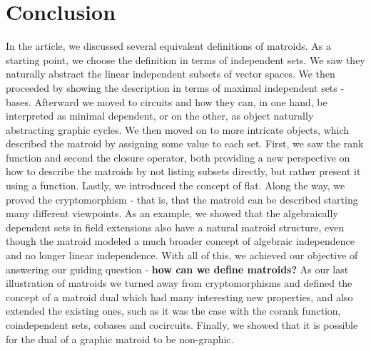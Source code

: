 \newpage
\section{Conclusion}
In the article, we discussed several equivalent definitions of matroids. As a starting point, we choose the definition in terms of independent sets. We saw they naturally abstract the linear independent subsets of vector spaces. We then proceeded by showing the description in terms of maximal independent sets - bases. Afterward we moved to circuits and how they can, in one hand, be interpreted as minimal dependent, or on the other, as object naturally abstracting graphic cycles. We then moved on to more intricate objects, which described the matroid by assigning some value to each set. First, we saw the rank function and second the closure operator, both providing a new perspective on how to describe the matroids by not listing subsets directly, but rather present it using a function. Lastly, we introduced the concept of flat. Along the way, we proved the cryptomorphism - that is, that the matroid can be described starting many different viewpoints. As an example, we showed that the algebraically dependent sets in field extensions also have a natural matroid structure, even though the matroid modeled a much broader concept of algebraic independence and no longer linear independence. With all of this, we achieved our objective of answering our guiding question - \textbf{how can we define matroids?} As our last illustration of matroids we turned away from cryptomorphisms and defined the concept of a matroid dual which had many interesting new properties, and also extended the existing ones, such as it was the case with the corank function, coindependent sets, cobases and cocircuits. Finally, we showed that it is possible for the dual of a graphic matroid to be non-graphic.
